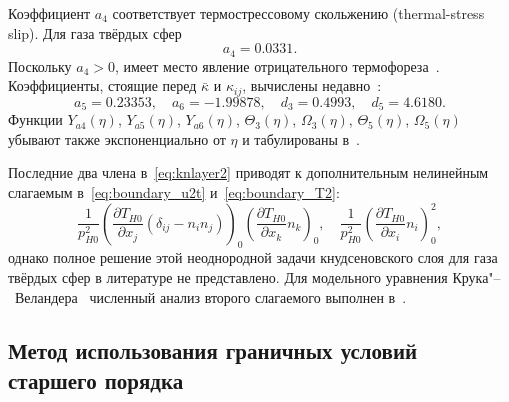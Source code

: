 \documentclass[
aps,%
12pt,%
final,%
notitlepage,%
oneside,%
onecolumn,%
nobibnotes,%
nofootinbib,%
superscriptaddress,%
noshowpacs,%
showkeys,%
floatfix,%
tightenlines,%
centertags]%
{revtex4}
\newcommand{\pder}[2][]{\frac{\partial#1}{\partial#2}}
\newcommand{\deltann}[2]{(\delta_{#1#2}-n_#1 n_#2)}
\newcommand{\onwall}[1]{\left(#1\right)_0}
\begin{document}
Коэффициент \(a_4\) соответствует термострессовому скольжению (thermal-stress slip).
Для газа твёрдых сфер~\cite{Ohwada1992, Takata2015}
\begin{equation}\label{eq:a4_coeff}
    a_4 = 0.0331.
\end{equation}
Поскольку \(a_4>0\), имеет место явление отрицательного термофореза~\cite{Ohwada1992}.
Коэффициенты, стоящие перед \(\bar\kappa\) и \(\kappa_{ij}\),
вычислены недавно~\cite{Takata2015curvature, Takata2015}:
\begin{equation}\label{eq:curvature_coeffs}
    a_5 = 0.23353, \quad a_6 = -1.99878, \quad d_3 = 0.4993, \quad d_5 = 4.6180.
\end{equation}
Функции \(Y_{a4}(\eta)\), \(Y_{a5}(\eta)\), \(Y_{a6}(\eta)\), \(\Theta_3(\eta)\),
\(\Omega_3(\eta)\), \(\Theta_5(\eta)\), \(\Omega_5(\eta)\) убывают также экспоненциально от \(\eta\)
и табулированы в~\cite{Ohwada1992, Sone2002, Sone2007, Takata2015curvature, Takata2015}.

Последние два члена в~\eqref{eq:knlayer2} приводят к дополнительным нелинейным слагаемым
в~\eqref{eq:boundary_u2t} и~\eqref{eq:boundary_T2}:
\begin{equation}\label{eq:boundary_nonlinear}
    \frac1{p_{H0}^2}\onwall{\pder[T_{H0}]{x_j}\deltann{i}{j}}\onwall{\pder[T_{H0}]{x_k}n_k}, \quad
    \frac1{p_{H0}^2}\onwall{\pder[T_{H0}]{x_i}n_i}^2,
\end{equation}
однако полное решение этой неоднородной задачи кнудсеновского слоя
для газа твёрдых сфер в литературе не представлено.
Для модельного уравнения Крука"--~Веландера~\cite{Krook1954, Welander1954}
численный анализ второго слагаемого выполнен в~\cite{Sone1970}.

\subsection{Метод использования граничных условий старшего порядка}
\end{document}
